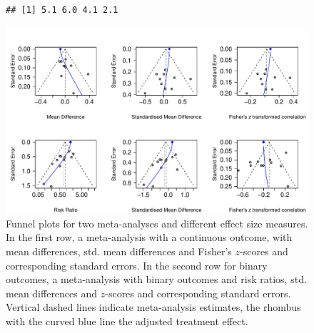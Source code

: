 \documentclass[11pt,a4paper,twoside]{book}\usepackage[]{graphicx}\usepackage[]{color}
\makeatletter
\newenvironment{kframe}{%
 \def\at@end@of@kframe{}%
 \ifinner\ifhmode%
  \def\at@end@of@kframe{\end{minipage}}%
  \begin{minipage}{\columnwidth}%
 \fi\fi%
 \def\FrameCommand##1{\hskip\@totalleftmargin \hskip-\fboxsep
 \colorbox{shadecolor}{##1}\hskip-\fboxsep
     \hskip-\linewidth \hskip-\@totalleftmargin \hskip\columnwidth}%
 \MakeFramed {\advance\hsize-\width
   \@totalleftmargin\z@ \linewidth\hsize
   \@setminipage}}%
 {\par\unskip\endMakeFramed%
 \at@end@of@kframe}
\newenvironment{knitrout}{}{} %
\makeatother
\begin{document}
\begin{figure}
\begin{knitrout}
\color{fgcolor}\begin{kframe}
\begin{verbatim}
## [1] 5.1 6.0 4.1 2.1
\end{verbatim}
\end{kframe}

{\centering \includegraphics[width=\textwidth-3cm]{figure/ch03_figunnamed-chunk-20-1} 

}



\end{knitrout}
\caption{Funnel plots for two meta-analyses and different effect size measures. In the first row, a meta-analysis with a continuous outcome, with mean differences, std. mean differences and Fisher's $z$-scores and corresponding standard errors. In the second row for binary outcomes, a meta-analysis with binary outcomes and risk ratios, std. mean differences and $z$-scores and corresponding standard errors.  Vertical dashed lines indicate meta-analysis estimates, the rhombus with the curved blue line the adjusted treatment effect.}
\label{fig:funnel.plot.change}
\end{figure}
\end{document}
